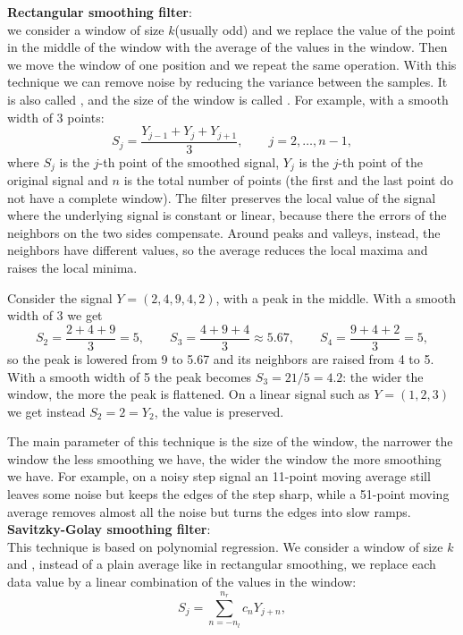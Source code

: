 \textbf{Rectangular smoothing filter}:\\
we consider a window of size $k$(usually odd) and we replace the value of the point in the middle of the window with the average of the values in the window. Then we move the window of one position and we repeat the same operation. With this technique we can remove noise by reducing the variance between the samples.
It is also called , and the size of the window is called . For example, with a smooth width of 3 points:
\[
    S_j=\frac{Y_{j-1}+Y_j+Y_{j+1}}{3}, \qquad j=2,\dots,n-1,
\]
where $S_j$ is the $j$-th point of the smoothed signal, $Y_j$ is the $j$-th point of the original signal and $n$ is the total number of points (the first and the last point do not have a complete window).
The filter preserves the local value of the signal where the underlying signal is constant or linear, because there the errors of the neighbors on the two sides compensate. Around peaks and valleys, instead, the neighbors have different values, so the average reduces the local maxima and raises the local minima.
\begin{example}
    Consider the signal $Y=(2,4,9,4,2)$, with a peak in the middle. With a smooth width of 3 we get
    \[
        S_2=\frac{2+4+9}{3}=5, \qquad S_3=\frac{4+9+4}{3}\approx 5.67, \qquad S_4=\frac{9+4+2}{3}=5,
    \]
    so the peak is lowered from 9 to 5.67 and its neighbors are raised from 4 to 5. With a smooth width of 5 the peak becomes $S_3=21/5=4.2$: the wider the window, the more the peak is flattened. On a linear signal such as $Y=(1,2,3)$ we get instead $S_2=2=Y_2$, the value is preserved.
\end{example}
The main parameter of this technique is the size of the window, the narrower the window the less smoothing we have, the wider the window the more smoothing we have.
For example, on a noisy step signal an 11-point moving average still leaves some noise but keeps the edges of the step sharp, while a 51-point moving average removes almost all the noise but turns the edges into slow ramps.
\\

\textbf{Savitzky-Golay smoothing filter}:\\
This technique is based on polynomial regression. We consider a window of size $k$ and , instead of a plain average like in rectangular smoothing, we replace each data value by a linear combination of the values in the window:
\[
    S_j=\sum_{n=-n_l}^{n_r} c_nY_{j+n},
\] 

